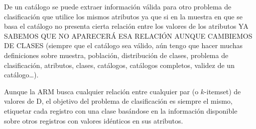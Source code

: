 De un catálogo se puede extraer información válida para otro problema de clasificación que utilice los mismos atributos ya que si en la muestra en que se basa el catálogo no presenta cierta relación entre los valores de los atributos YA SABEMOS QUE NO APARECERÁ ESA RELACIÓN AUNQUE CAMBIEMOS DE CLASES (siempre que el catálogo sea válido, aún tengo que hacer muchas definiciones sobre muestra, población, distribución de clases, problema de clasificación, atributos, clases, catálogos, catálogos completos, validez de un catálogo\ldots).

Aunque la ARM busca cualquier relación entre cualquier par (o $k$-itemset) de valores de D, el objetivo del problema de clasificación es siempre el mismo, etiquetar cada registro con una clase basándose en la información disponible sobre otros registros con valores idénticos en sus atributos.